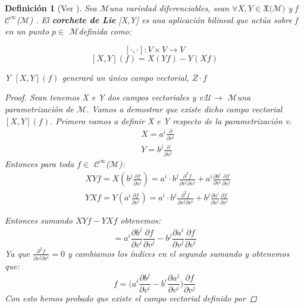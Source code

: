 \documentclass[pdftex,11pt,a4paper]{book}
\newtheorem{defi}{Definici\'on}
\newcommand{\M}{$\mathscr{M}$}
\newcommand{\U}{$\mathscr{U}$}
\newcommand{\Cinf}{ $\mathscr{C}^\infty$}
\begin{document}
\begin{defi} [Ver \cite{DoCarmoRiemann}]
Sea \M una variedad diferenciables, sean $\forall X, Y  \in \mathfrak{X}($\M$)$ y  f \Cinf(\M) .
El \textbf{corchete de Lie} [X,Y] es una aplicación bilineal que actúa sobre f  en un punto $p \in $ \M definida como:

$$[\cdot,\cdot]: V\times V \to V $$
$$[X,Y](f)= X(Yf)-Y(Xf)  $$

Y $[X,Y](f)$ generará un único campo vectorial, $Z\cdot f$

\begin{proof}
Sean tenemos X e Y dos campos vectoriales y v:\U $\to$ \M una parametrización de \M. Vamos a demostrar que existe dicho campo vectorial  $[X,Y](f)$.
Primero vamos a definir X e Y respecto de la parametrización v.
\begin{equation}
    \begin{array}{cc}
         & X = a^i \frac{\partial}{\partial v^i} \\
         & Y = b^j \frac{\partial}{\partial v^j}
    \end{array}
\end{equation}
Entonces para toda $f\in$\Cinf(\M):
\begin{equation}
    \begin{array}{cc}
         & XYf=X( b^j \frac{\partial f }{\partial v^j} )= a^i\cdot b^j \frac{\partial^2 f}{\partial v^i\partial v^j} + a^i \frac{\partial b ^j}{\partial v^i}\frac{\partial f}{\partial v^j} \\
         & YXf = Y( a^i \frac{\partial f}{\partial v^i}) =  a^i\cdot b^j \frac{\partial^2 f}{\partial v^j\partial v^i}  + b^j\frac{\partial a^i}{\partial v^j}\frac{\partial f}{\partial v^i}
         
    \end{array}
\end{equation}

Entonces sumando $XYf -YXf$ obtenemos:
\begin{equation}
    [X,Y]=   a^i \frac{\partial b^j}{\partial v^i}\frac{\partial f}{\partial v^j} -  b^j\frac{\partial a^i}{\partial v^j}\frac{\partial f}{\partial v^i}
\end{equation}
Ya que $\frac{\partial^2 f}{\partial v^j\partial v^i}=0$ y cambiamos los índices en el segundo sumando y obtenemos que:
\begin{equation}
    [X,Y]f= \bigg( a^i \frac{\partial b^j}{\partial v^i} - b^i\frac{\partial a^j}{\partial v^i} \bigg)\frac{\partial f}{\partial v^j}
\end{equation}
Con esto hemos probado que existe el campo vectorial definido por 
\end{proof}
\end{defi}
\end{document}
